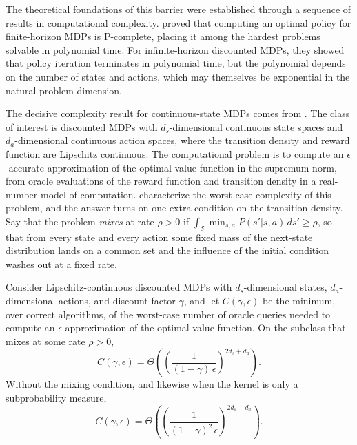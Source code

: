 

The theoretical foundations of this barrier were established through a sequence of results in computational complexity. \citet{papadimitriou1987} proved that computing an optimal policy for finite-horizon MDPs is P-complete, placing it among the hardest problems solvable in polynomial time. For infinite-horizon discounted MDPs, they showed that policy iteration terminates in polynomial time, but the polynomial depends on the number of states and actions, which may themselves be exponential in the natural problem dimension.

The decisive complexity result for continuous-state MDPs comes from \citet{chow1989complexity}. The class of interest is discounted MDPs with $d_s$-dimensional continuous state spaces and $d_a$-dimensional continuous action spaces, where the transition density and reward function are Lipschitz continuous. The computational problem is to compute an $\epsilon$-accurate approximation of the optimal value function in the supremum norm, from oracle evaluations of the reward function and transition density in a real-number model of computation. \citeauthor{chow1989complexity} characterize the worst-case complexity of this problem, and the answer turns on one extra condition on the transition density. Say that the problem \emph{mixes} at rate $\rho > 0$ if $\int_{\mathcal{S}} \min_{s, a} P(s'|s,a) \, ds' \geq \rho$, so that from every state and every action some fixed mass of the next-state distribution lands on a common set and the influence of the initial condition washes out at a fixed rate.

\begin{theorem}
\label{thm:chow_tsitsiklis}
Consider Lipschitz-continuous discounted MDPs with $d_s$-dimensional states, $d_a$-dimensional actions, and discount factor $\gamma$, and let $C(\gamma, \epsilon)$ be the minimum, over correct algorithms, of the worst-case number of oracle queries needed to compute an $\epsilon$-approximation of the optimal value function. On the subclass that mixes at some rate $\rho > 0$,
\begin{equation}
C(\gamma, \epsilon) = \Theta\left( \left( \frac{1}{(1-\gamma)\,\epsilon} \right)^{2d_s + d_a} \right).
\label{eq:ct_mixing}
\end{equation}
Without the mixing condition, and likewise when the kernel is only a subprobability measure,
\begin{equation}
C(\gamma, \epsilon) = \Theta\left( \left( \frac{1}{(1-\gamma)^2\,\epsilon} \right)^{2d_s + d_a} \right).
\label{eq:ct_general}
\end{equation}
\end{theorem}

